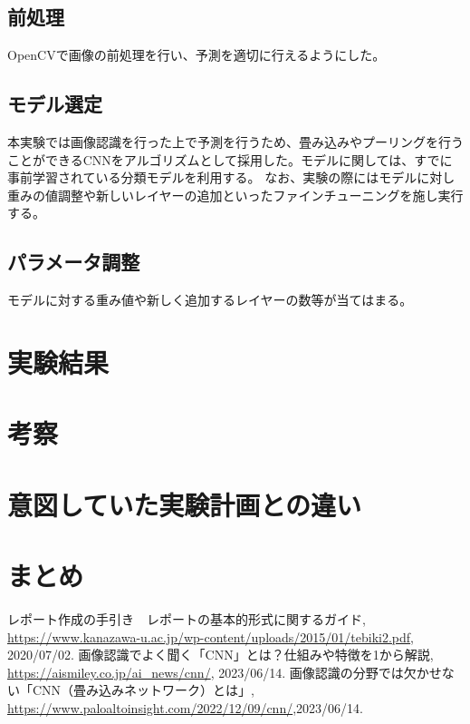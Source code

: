 \documentclass[a4paper, 11pt, titlepage]{jsarticle}
\begin{document}
\subsection{前処理}
OpenCVで画像の前処理を行い、予測を適切に行えるようにした。 \par

\subsection{モデル選定}
本実験では画像認識を行った上で予測を行うため、畳み込みやプーリングを行うことができるCNNをアルゴリズムとして採用した。モデルに関しては、すでに事前学習されている分類モデルを利用する。%
なお、実験の際にはモデルに対し重みの値調整や新しいレイヤーの追加といったファインチューニングを施し実行する。%

\subsection{パラメータ調整}
モデルに対する重み値や新しく追加するレイヤーの数等が当てはまる。%

\section{実験結果}


\section{考察}


\section{意図していた実験計画との違い}


\section{まとめ}


\begin{thebibliography}{n}
  レポート作成の手引き　レポートの基本的形式に関するガイド, \url{https://www.kanazawa-u.ac.jp/wp-content/uploads/2015/01/tebiki2.pdf}, 2020/07/02.
	画像認識でよく聞く「CNN」とは？仕組みや特徴を1から解説, \url{https://aismiley.co.jp/ai_news/cnn/}, 2023/06/14.
	画像認識の分野では欠かせない「CNN（畳み込みネットワーク）とは」, \url{https://www.paloaltoinsight.com/2022/12/09/cnn/},2023/06/14.
\end{thebibliography}
\end{document}
